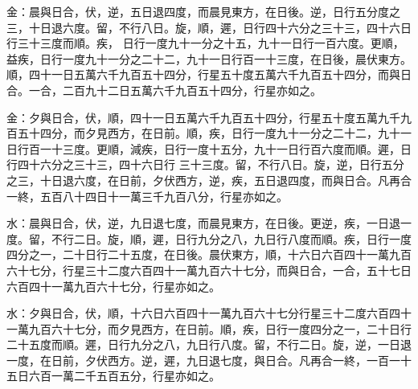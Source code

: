 \begin{pinyinscope}
 金：晨與日合，伏，逆，五日退四度，而晨見東方，在日後。逆，日行五分度之三，十日退六度。留，不行八日。旋，順，遲，日行四十六分之三十三，四十六日行三十三度而順。疾，
 日行一度九十一分之十五，九十一日行一百六度。更順，益疾，日行一度九十一分之二十二，九十一日行百一十三度，在日後，晨伏東方。順，四十一日五萬六千九百五十四分，行星五十度五萬六千九百五十四分，而與日合。一合，二百九十二日五萬六千九百五十四分，行星亦如之。



 金：夕與日合，伏，順，四十一日五萬六千九百五十四分，行星五十度五萬九千九百五十四分，而夕見西方，在日前。順，疾，日行一度九十一分之二十二，九十一日行百一十三度。更順，減疾，日行一度十五分，九十一日行百六度而順。遲，日行四十六分之三十三，四十六日行
 三十三度。留，不行八日。旋，逆，日行五分之三，十日退六度，在日前，夕伏西方，逆，疾，五日退四度，而與日合。凡再合一終，五百八十四日十一萬三千九百八分，行星亦如之。



 水：晨與日合，伏，逆，九日退七度，而晨見東方，在日後。更逆，疾，一日退一度。留，不行二日。旋，順，遲，日行九分之八，九日行八度而順。疾，日行一度四分之一，二十日行二十五度，在日後。晨伏東方，順，十六日六百四十一萬九百六十七分，行星三十二度六百四十一萬九百六十七分，而與日合，一合，五十七日六百四十一萬九百六十七分，行星亦如之。



 水：夕與日合，伏，順，十六日六百四十一萬九百六十七分行星三十二度六百四十一萬九百六十七分，而夕見西方，在日前。順，疾，日行一度四分之一，二十日行二十五度而順。遲，日行九分之八，九日行八度。留，不行二日。旋，逆，一日退一度，在日前，夕伏西方。逆，遲，九日退七度，與日合。凡再合一終，一百一十五日六百一萬二千五百五分，行星亦如之。



\end{pinyinscope}